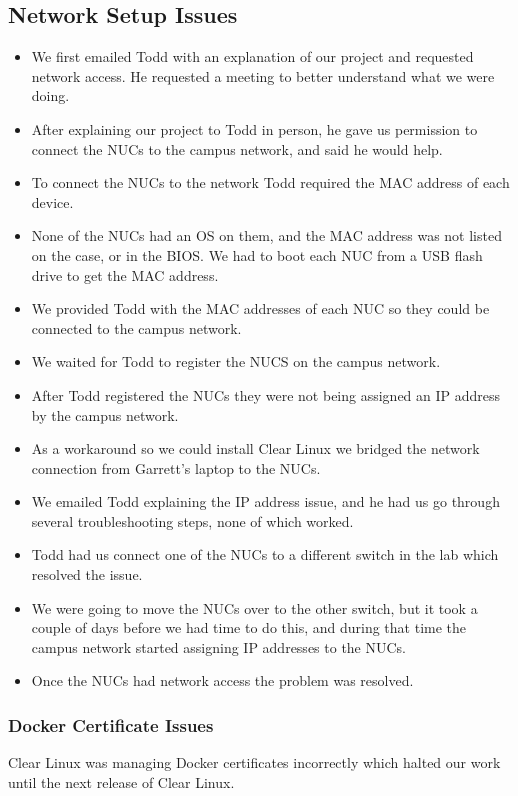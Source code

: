 \documentclass[pdf]{beamer}
\begin{document}
\begin{frame}[allowframebreaks]
	\subsection{Network Setup Issues}
	\begin{itemize}
		\item We first emailed Todd with an explanation of our project and 
			requested network access. He requested a meeting to better 
			understand what we were doing.
		\item After explaining our project to Todd in person, he gave us 
			permission to connect the NUCs to the campus network, and said he 
			would help.
		\item To connect the NUCs to the network Todd required the MAC address 
			of each device.
		\item None of the NUCs had an OS on them, and the MAC address was not 
			listed on the case, or in the BIOS.
			We had to boot each NUC from a USB flash drive to get the MAC 
			address.
		\item We provided Todd with the MAC addresses of each NUC so they could 
			be connected to the campus network.
		\item We waited for Todd to register the NUCS on the campus network.
		\item After Todd registered the NUCs they were not being assigned an IP 
			address by the campus network.
		\item As a workaround so we could install Clear Linux we bridged the 
			network connection from Garrett's laptop to the NUCs.
		\item We emailed Todd explaining the IP address issue, and he had us go
			through several troubleshooting steps, none of which worked.
		\item Todd had us connect one of the NUCs to a different switch in the 
			lab which resolved the issue.
		\item We were going to move the NUCs over to the other switch, but it 
			took a couple of days before we had time to do this, and during 
			that time the campus network started assigning IP addresses to the 
			NUCs.
		\item Once the NUCs had network access the problem was resolved.
	\end{itemize}

\end{frame}

\begin{frame}
	\frametitle{Docker Certificate Issues}
	Clear Linux was managing Docker certificates incorrectly which halted our work until the next release of Clear Linux.
\end{frame}
\end{document}
